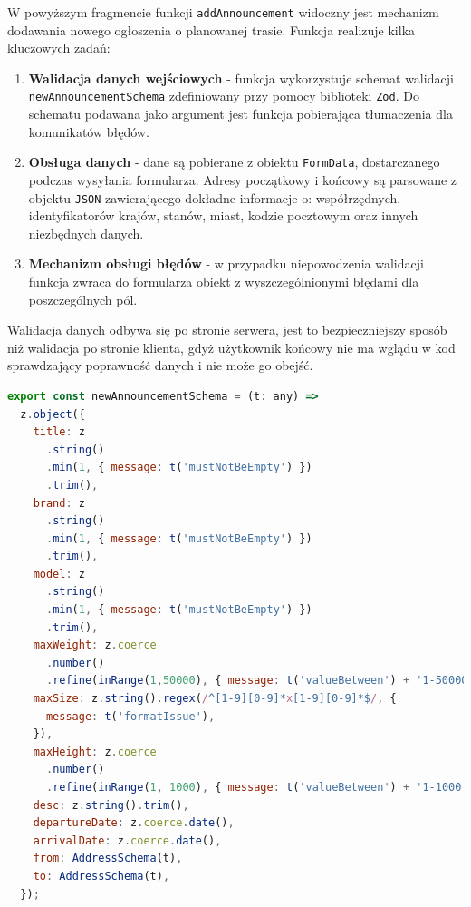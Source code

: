 W powyższym fragmencie funkcji \texttt{addAnnouncement} widoczny jest mechanizm dodawania nowego ogłoszenia o planowanej trasie. Funkcja realizuje kilka kluczowych zadań:
\begin{enumerate}
    \item \textbf{Walidacja danych wejściowych} - funkcja wykorzystuje schemat walidacji \texttt{newAnnouncementSchema} zdefiniowany przy pomocy biblioteki \texttt{Zod}. Do schematu podawana jako argument jest funkcja pobierająca tłumaczenia dla komunikatów błędów.
    \item \textbf{Obsługa danych} - dane są pobierane z obiektu \texttt{FormData}, dostarczanego podczas wysyłania formularza. Adresy początkowy i końcowy są parsowane z objektu \texttt{JSON} zawierającego dokładne informacje o: współrzędnych, identyfikatorów krajów, stanów, miast, kodzie pocztowym oraz innych niezbędnych danych.
    \item \textbf{Mechanizm obsługi błędów} - w przypadku niepowodzenia walidacji funkcja zwraca do formularza obiekt z wyszczególnionymi błędami dla poszczególnych pól.
\end{enumerate}

Walidacja danych odbywa się po stronie serwera, jest to bezpieczniejszy sposób niż walidacja po stronie klienta, gdyż użytkownik końcowy nie ma wglądu w kod sprawdzający poprawność danych i nie może go obejść.

{\belowcaptionskip=-9pt
\begin{lstlisting}[language=JavaScript,caption=Schemat walidacji danych wejściowych, label=lst:addAnnouncementSchema]
export const newAnnouncementSchema = (t: any) =>
  z.object({
    title: z
      .string()
      .min(1, { message: t('mustNotBeEmpty') })
      .trim(),
    brand: z
      .string()
      .min(1, { message: t('mustNotBeEmpty') })
      .trim(),
    model: z
      .string()
      .min(1, { message: t('mustNotBeEmpty') })
      .trim(),
    maxWeight: z.coerce
      .number()
      .refine(inRange(1,50000), { message: t('valueBetween') + '1-50000' }),
    maxSize: z.string().regex(/^[1-9][0-9]*x[1-9][0-9]*$/, {
      message: t('formatIssue'),
    }),
    maxHeight: z.coerce
      .number()
      .refine(inRange(1, 1000), { message: t('valueBetween') + '1-1000' }),
    desc: z.string().trim(),
    departureDate: z.coerce.date(),
    arrivalDate: z.coerce.date(),
    from: AddressSchema(t),
    to: AddressSchema(t),
  });
\end{lstlisting}
}

